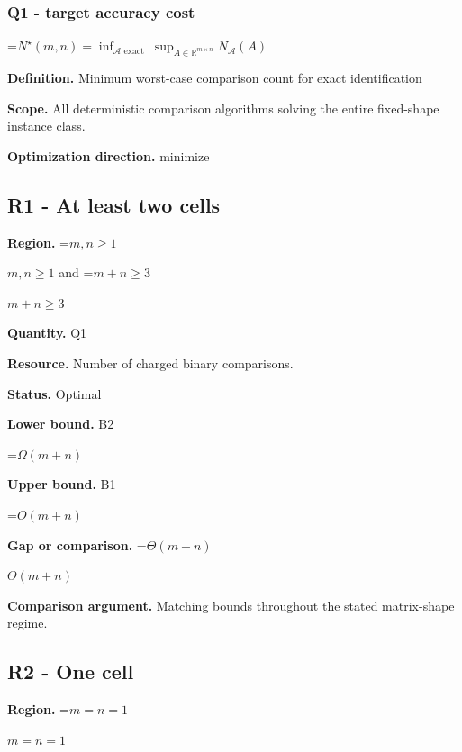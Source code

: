 \documentclass[10pt,a4paper]{article}
\newcommand{\AtlasMath}[1]{\par\begingroup\centering\setbox0=\hbox{$\displaystyle #1$}\ifdim\wd0>1.4\linewidth\typeout{ATLAS WIDE FORMULA: \the\wd0}\fi\ifdim\wd0>\linewidth\resizebox{\linewidth}{!}{\box0}\else\box0\fi\par\endgroup}
\newcommand{\AtlasInlineMath}[1]{\begingroup\setbox0=\hbox{$#1$}\ifdim\wd0>.4\linewidth\endgroup\AtlasMath{#1}\else\endgroup$#1$\fi}
\begin{document}
\subsubsection{Q1 - target accuracy cost}


\AtlasMath{N^\star(m,n)=\inf_{\mathcal A\text{ exact}}\ \sup_{A\in\mathbb R^{m\times n}}N_{\mathcal A}(A)}


\textbf{Definition.} Minimum worst-case comparison count for exact identification



\textbf{Scope.} All deterministic comparison algorithms solving the entire fixed-shape instance class.



\textbf{Optimization direction.} minimize



\subsection{R1 - At least two cells}


\textbf{Region.} \AtlasInlineMath{m,n\ge1} and \AtlasInlineMath{m+n\ge3}



\textbf{Quantity.} Q1



\textbf{Resource.} Number of charged binary comparisons.



\textbf{Status.} Optimal



\textbf{Lower bound.} B2



\AtlasMath{\Omega(m+n)}


\textbf{Upper bound.} B1



\AtlasMath{O(m+n)}


\textbf{Gap or comparison.} \AtlasInlineMath{\Theta(m+n)}



\textbf{Comparison argument.} Matching bounds throughout the stated matrix-shape regime.



\subsection{R2 - One cell}


\textbf{Region.} \AtlasInlineMath{m=n=1}
\end{document}
